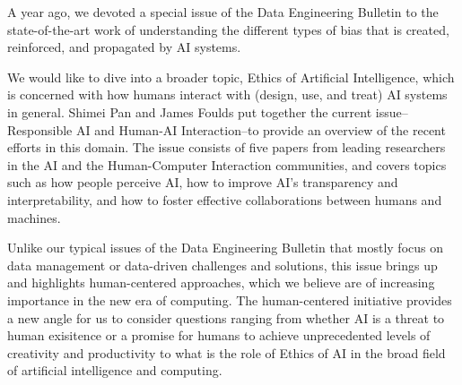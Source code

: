 \documentclass[11pt]{article}
\begin{document}
A year ago, we devoted a special issue of the Data Engineering
Bulletin to the state-of-the-art work of understanding the different
types of bias that is created, reinforced, and propagated by AI
systems.

We would like to dive into a broader topic, Ethics of Artificial
Intelligence, which is concerned with how humans interact with
(design, use, and treat) AI systems in general. Shimei Pan and James
Foulds put together the current issue--Responsible AI and Human-AI
Interaction–to provide an overview of the recent efforts in this
domain. The issue consists of five papers from leading researchers in
the AI and the Human-Computer Interaction communities, and covers
topics such as how people perceive AI, how to improve AI’s
transparency and interpretability, and how to foster effective
collaborations between humans and machines.

Unlike our typical issues of the Data Engineering Bulletin that mostly
focus on data management or data-driven challenges and solutions, this
issue brings up and highlights human-centered approaches, which we
believe are of increasing importance in the new era of computing. The
human-centered initiative provides a new angle for us to consider
questions ranging from whether AI is a threat to human exisitence or a
promise for humans to achieve unprecedented levels of creativity and
productivity to what is the role of Ethics of AI in the broad field of
artificial intelligence and computing.





\end{document}
